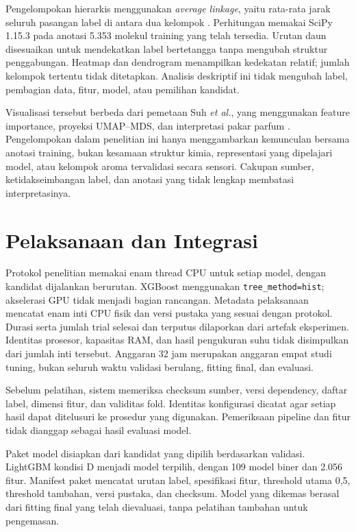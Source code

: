 Pengelompokan hierarkis menggunakan \textit{average linkage}, yaitu rata-rata jarak seluruh pasangan label di antara dua kelompok \cite{scipylinkage2026}. Perhitungan memakai SciPy 1.15.3 pada anotasi 5.353 molekul training yang telah tersedia. Urutan daun disesuaikan untuk mendekatkan label bertetangga tanpa mengubah struktur penggabungan. Heatmap dan dendrogram menampilkan kedekatan relatif; jumlah kelompok tertentu tidak ditetapkan. Analisis deskriptif ini tidak mengubah label, pembagian data, fitur, model, atau pemilihan kandidat.

Visualisasi tersebut berbeda dari pemetaan Suh \textit{et al.}, yang menggunakan feature importance, proyeksi UMAP--MDS, dan interpretasi pakar parfum \cite{suh2025}. Pengelompokan dalam penelitian ini hanya menggambarkan kemunculan bersama anotasi training, bukan kesamaan struktur kimia, representasi yang dipelajari model, atau kelompok aroma tervalidasi secara sensori. Cakupan sumber, ketidakseimbangan label, dan anotasi yang tidak lengkap membatasi interpretasinya.

\section{Pelaksanaan dan Integrasi}
Protokol penelitian memakai enam thread CPU untuk setiap model, dengan kandidat dijalankan berurutan. XGBoost menggunakan \texttt{tree\_method=hist}; akselerasi GPU tidak menjadi bagian rancangan. Metadata pelaksanaan mencatat enam inti CPU fisik dan versi pustaka yang sesuai dengan protokol. Durasi serta jumlah trial selesai dan terputus dilaporkan dari artefak eksperimen. Identitas prosesor, kapasitas RAM, dan hasil pengukuran suhu tidak disimpulkan dari jumlah inti tersebut. Anggaran 32 jam merupakan anggaran empat studi tuning, bukan seluruh waktu validasi berulang, fitting final, dan evaluasi.

Sebelum pelatihan, sistem memeriksa checksum sumber, versi dependency, daftar label, dimensi fitur, dan validitas fold. Identitas konfigurasi dicatat agar setiap hasil dapat ditelusuri ke prosedur yang digunakan. Pemeriksaan pipeline dan fitur tidak dianggap sebagai hasil evaluasi model.

Paket model disiapkan dari kandidat yang dipilih berdasarkan validasi. LightGBM kondisi D menjadi model terpilih, dengan 109 model biner dan 2.056 fitur. Manifest paket mencatat urutan label, spesifikasi fitur, threshold utama 0,5, threshold tambahan, versi pustaka, dan checksum. Model yang dikemas berasal dari fitting final yang telah dievaluasi, tanpa pelatihan tambahan untuk pengemasan.

